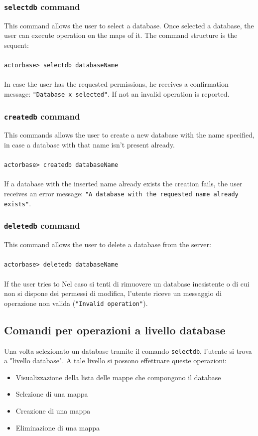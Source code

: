 \documentclass[a4paper]{article}
\begin{document}
	\subsubsection{\texttt{selectdb} command}
	This command allows the user to select a database. Once selected a database, the user can execute operation on the maps of it. The command structure is the sequent:
	\\ \\
	\texttt{actorbase>	selectdb databaseName}
	\\ \\
	In case the user has the requested permissions, he receives a confirmation message: \texttt{"Database x selected"}. If not an invalid operation is reported.

	\subsubsection{\texttt{createdb} command}
	This commands allows the user to create a new database with the name specified, in case a database with that name isn't present already.
	\\ \\
	\texttt{actorbase>	createdb databaseName}
	\\ \\
	If a database with the inserted name already exists the creation fails, the user receives an error message: \texttt{"A database with the requested name already exists"}.

	\subsubsection{\texttt{deletedb} command}
	This command allows the user to delete a database from the server:
	\\ \\
	\texttt{actorbase>	deletedb databaseName}
	\\ \\
	If the user tries to 
	Nel caso si tenti di rimuovere un database inesistente o di cui non si dispone dei permessi di modifica, l'utente riceve un messaggio di operazione non valida (\texttt{"Invalid operation"}).
	

	\subsection{Comandi per operazioni a livello database}
	Una volta selezionato un database tramite il comando \texttt{selectdb}, l'utente si trova a "livello database". A tale livello si possono effettuare queste operazioni:
	\begin{itemize}
		\item Visualizzazione della lista delle mappe che compongono il database
		\item Selezione di una mappa
		\item Creazione di una mappa
		\item Eliminazione di una mappa
	\end{itemize}
\end{document}

